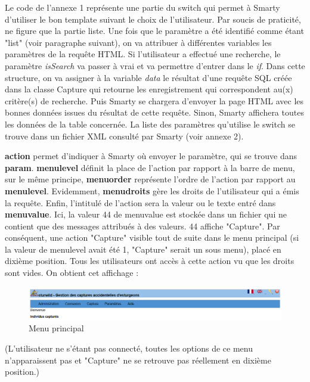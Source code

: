 \documentclass[12pt,a4paper,titlepage,twoside]{report}
\begin{document}
	Le code de l'annexe 1 représente une partie du switch qui permet à Smarty d'utiliser le bon template suivant le choix de l'utilisateur. Par soucis de praticité, ne figure que la partie liste.
Une fois que le paramètre a été identifié comme étant "list" (voir paragraphe suivant), on va attribuer à différentes variables les paramètres de la requête HTML. Si l'utilisateur a effectué une recherche, le paramètre \textit{isSearch} va passer à vrai et va permettre d'entrer dans le \textit{if}. Dans cette structure, on va assigner à la variable \textit{data} le résultat d'une requête SQL créée dans la classe Capture qui retourne les enregistrement qui correspondent au(x) critère(s) de recherche. Puis Smarty se chargera d'envoyer la page HTML avec les bonnes données issues du résultat de cette requête. 
Sinon, Smarty affichera toutes les données de la table concernée.\newline\newline
\clearpage
La liste des paramètres qu'utilise le switch se trouve dans un fichier XML consulté par Smarty (voir annexe 2). 
\newline

\textbf{action} permet d'indiquer à Smarty où envoyer le paramètre, qui se trouve dans \textbf{param}. \textbf{menulevel} définit la place de l'action par rapport à la barre de menu, sur le même principe, \textbf{menuorder} représente l'ordre de l'action par rapport au \textbf{menulevel}. Evidemment, \textbf{menudroits} gère les droits de l'utilisateur qui a émis la requête. Enfin, l'intitulé de l'action sera la valeur ou le texte entré dans \textbf{menuvalue}. Ici, la valeur 44 de menuvalue est stockée dans un fichier qui ne contient que des messages attribués à des valeurs. 44 affiche "Capture". Par conséquent, une action "Capture" visible tout de suite dans le menu principal (si la valeur de menulevel avait été 1, "Capture" serait un sous menu), placé en dixième position. Tous les utilisateurs ont accès à cette action vu que les droits sont vides. On obtient cet affichage :\newline

\begin{figure}[h]
\centering
\includegraphics[scale=0.5]{pictures/menuprincipal.png}
\caption{Menu principal}
\end{figure}
(L'utilisateur ne s'étant pas connecté, toutes les options de ce menu n'apparaissent pas et "Capture" ne se retrouve pas réellement en dixième position.)
\end{document}
